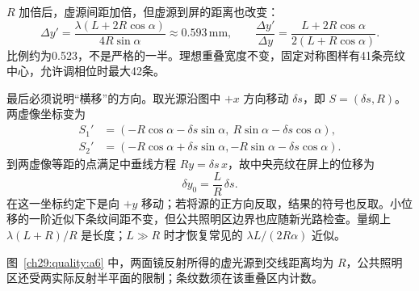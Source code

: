 \begin{xesolution}
$R$ 加倍后，虚源间距加倍，但虚源到屏的距离也改变：
\[
 \Delta y'=\frac{\lambda(L+2R\cos\alpha)}{4R\sin\alpha}
 \approx0.593\,\mathrm{mm},\qquad
 \frac{\Delta y'}{\Delta y}=\frac{L+2R\cos\alpha}{2(L+R\cos\alpha)}.
\]
比例约为0.523，不是严格的一半。理想重叠宽度不变，固定对称图样有41条亮纹中心，允许调相位时最大42条。

最后必须说明“横移”的方向。取光源沿图中 $+x$ 方向移动 $\delta s$，即 $S=(\delta s,R)$。两虚像坐标变为
\[
 \begin{split}
 S_1'&=(-R\cos\alpha-\delta s\sin\alpha,\ R\sin\alpha-\delta s\cos\alpha),\\
 S_2'&=(-R\cos\alpha+\delta s\sin\alpha,-R\sin\alpha-\delta s\cos\alpha).
 \end{split}
\]
到两虚像等距的点满足中垂线方程 $Ry=\delta s\,x$，故中央亮纹在屏上的位移为
\[
 \boxed{\delta y_0=\frac LR\,\delta s}.
\]
在这一坐标约定下是向 $+y$ 移动；若将源的正方向反取，结果的符号也反取。小位移的一阶近似下条纹间距不变，但公共照明区边界也应随新光路检查。量纲上 $\lambda(L+R)/R$ 是长度；$L\gg R$ 时才恢复常见的 $\lambda L/(2R\alpha)$ 近似。

图~\ref{ch29:quality:a6} 中，两面镜反射所得的虚光源到交线距离均为 $R$，公共照明区还受两实际反射半平面的限制；条纹数须在该重叠区内计数。
\end{xesolution}


